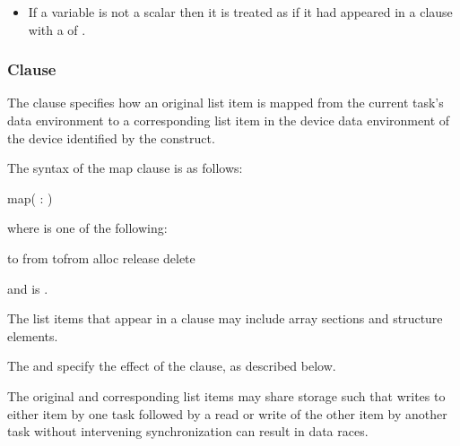 {{{{\begin{itemize}
\item If a variable is not a scalar then it is treated as if it had appeared 
in a  clause with a  of .
\end{itemize}

\subsubsection{ Clause}
\label{subsec:map Clause}
\summary
The  clause specifies how an original list item is mapped from the current task's data environment to a corresponding list item in the device data environment of the device identified by the construct.

\syntax
The syntax of the map clause is as follows:

\begin{boxedcode}
map(\plc{[ [map-type-modifier[,]] map-type} : \plc{] list})
\end{boxedcode}

where  is one of the following:

\begin{indentedcodelist}
to
from
tofrom
alloc
release
delete
\end{indentedcodelist}

and  is .

\descr
The list items that appear in a  clause may include array sections and structure elements.

The  and  specify the effect of the  clause, as described below.

The original and corresponding list items may share storage such that writes to either
item by one task followed by a read or write of the other item by another task without
intervening synchronization can result in data races.

}}}}
